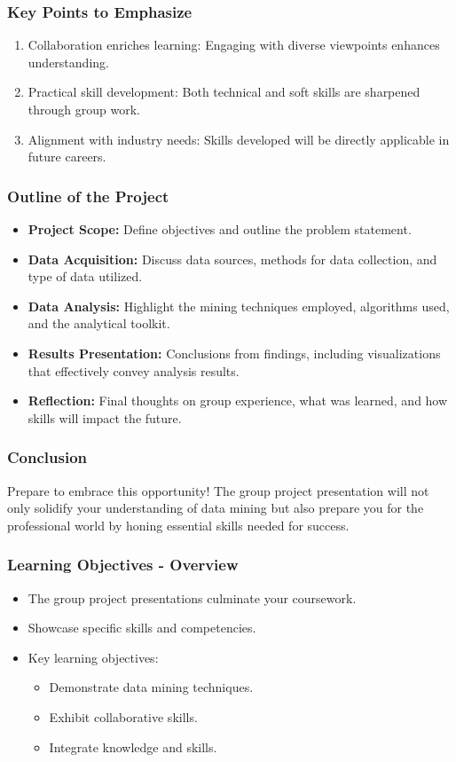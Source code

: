 \documentclass[aspectratio=169]{beamer}
\begin{document}
\begin{frame}[fragile]
    \frametitle{Key Points to Emphasize}
    \begin{enumerate}
        \item Collaboration enriches learning: Engaging with diverse viewpoints enhances understanding.
        \item Practical skill development: Both technical and soft skills are sharpened through group work.
        \item Alignment with industry needs: Skills developed will be directly applicable in future careers.
    \end{enumerate}
\end{frame}

\begin{frame}[fragile]
    \frametitle{Outline of the Project}
    \begin{itemize}
        \item \textbf{Project Scope:} Define objectives and outline the problem statement.
        \item \textbf{Data Acquisition:} Discuss data sources, methods for data collection, and type of data utilized.
        \item \textbf{Data Analysis:} Highlight the mining techniques employed, algorithms used, and the analytical toolkit.
        \item \textbf{Results Presentation:} Conclusions from findings, including visualizations that effectively convey analysis results.
        \item \textbf{Reflection:} Final thoughts on group experience, what was learned, and how skills will impact the future.
    \end{itemize}
\end{frame}

\begin{frame}[fragile]
    \frametitle{Conclusion}
    Prepare to embrace this opportunity! The group project presentation will not only solidify your understanding of data mining but also prepare you for the professional world by honing essential skills needed for success.
\end{frame}

\begin{frame}[fragile]
    \frametitle{Learning Objectives - Overview}
    \begin{itemize}
        \item The group project presentations culminate your coursework.
        \item Showcase specific skills and competencies.
        \item Key learning objectives:
        \begin{itemize}
            \item Demonstrate data mining techniques.
            \item Exhibit collaborative skills.
            \item Integrate knowledge and skills.
        \end{itemize}
    \end{itemize}
\end{frame}
\end{document}
